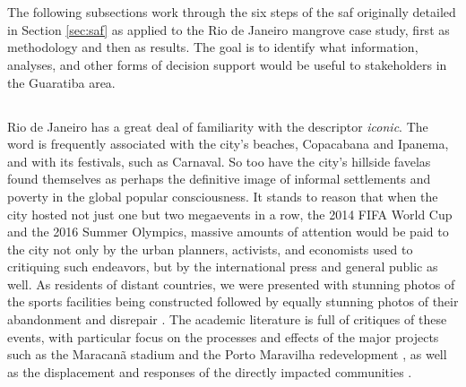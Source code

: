 \section{} \label{sec:rio-saf}

The following subsections work through the six steps of the \ac{saf} originally detailed in Section \ref{sec:saf} as applied to the Rio de Janeiro mangrove case study, first as methodology and then as results. The goal is to identify what information, analyses, and other forms of decision support would be useful to stakeholders in the Guaratiba area.

\subsection{} \label{sec:rio-saf-method}

\subsubsection{} \label{sec:rio-context}

Rio de Janeiro has a great deal of familiarity with the descriptor \textit{iconic}. The word is frequently associated with the city's beaches, Copacabana and Ipanema, and with its festivals, such as Carnaval. So too have the city's hillside favelas found themselves as perhaps the definitive image of informal settlements and poverty in the global popular consciousness. It stands to reason that when the city hosted not just one but two megaevents in a row, the 2014 FIFA World Cup and the 2016 Summer Olympics, massive amounts of attention would be paid to the city not only by the urban planners, activists, and economists used to critiquing such endeavors, but by the international press and general public as well. As residents of distant countries, we were presented with stunning photos of the sports facilities being constructed \cite{umlaufRioCityTransformed2016} followed by equally stunning photos of their abandonment and disrepair \cite{olivaresRioOlympicVenues2017}. The academic literature is full of critiques of these events, with particular focus on the processes and effects of the major projects such as the Maracanã stadium and the Porto Maravilha redevelopment \cite{sanchezMegaeventsUrbanRegeneration2013}, as well as the displacement and responses of the directly impacted communities  \cite{talbotHumanRightsAbuses2018,viehoffPoliticsMegaeventPlanning2016}. 

